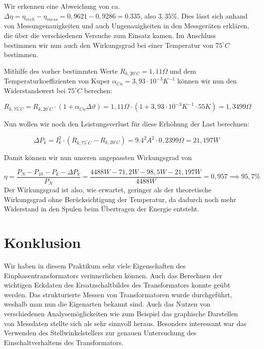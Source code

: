 \documentclass{article}
\begin{document}
Wir erkennen eine Abweichung von ca. $\Delta \eta = \eta_{rech} - \eta_{mess} = 0,9621 - 0,9286 = 0.335$, also $3,35\%$. Dies lässt sich anhand von Messungenauigkeiten und auch Ungenauigkeiten in den Messgeräten erklären, die über die verschiedenen Versuche zum Einsatz kamen. Im Anschluss bestimmen wir nun auch den Wirkungsgrad bei einer Temperatur von $75^{\circ}C$ bestimmen.

Mithilfe des vorher bestimmten Werte $R_{k,20^{\circ}C} = 1,11\Omega$ und dem Temperaturkoeffizienten von Kuper $\alpha_{Cu} = 3,93 \cdot 10^{-3}K^{-1}$ können wir nun den Widerstandswert bei $75^{\circ}C$ berechen:

\begin{equation*}
  \label{eq:4}
  R_{k,75^{\circ}C} = R_{k, 20^{\circ}C} \cdot (1+\alpha_{Cu}\Delta\vartheta) = 1,11\Omega \cdot (1+3,93\cdot 10^{-3}K^{-1}\cdot 55K) = 1,3499\Omega
\end{equation*}

Nun wollen wir noch den Leistungsverlust für diese Erhöhung der Last berechnen:

\begin{equation*}
  \label{eq:2}
  \Delta P_{k} = I_{k}^{2} \cdot (R_{k,75^{\circ}C} - R_{k,20^{\circ}C}) = 9.4^{2}A^{2} \cdot 0,2399\Omega = 21,197W
\end{equation*}

Damit können wir nun unseren angepassten Wirkungsgrad von

\begin{equation*}
  \label{eq:5}
  \eta = \frac{P_{N} - P_{10} - P_{k} - \Delta P_{k}}{P_{N}} = \frac{4488W-71,2W-98,5W-21,197W}{4488W} = 0,957 \implies 95,7\%
\end{equation*}
Der Wirkungsgrad ist also, wie erwartet, geringer als der theoretische Wirkungsgrad ohne Berücksichtigung der Temperatur, da dadurch noch mehr Widerstand in den Spulen beim Übertragen der Energie entsteht.

\section{Konklusion}
\label{sec:konklusion}

Wir haben in diesem Praktikum sehr viele Eigenschaften des Einphasentransformators verinnerlichen können. Auch das Berechnen der wichtigen Eckdaten des Ersatzschaltbildes des Transformators konnte geübt werden. Das strukturierte Messen von Transformatoren wurde durchgeführt, weshalb man nun die Eigenarten bekannt sind. Auch das Nutzen von verschiedenen Analysemöglickeiten wie zum Beispiel das graphische Darstellen von Messdaten stellte sich als sehr sinnvoll heraus. Besonders interessant war das Verwenden des Stellwinkelstellers zur genauen Untersuchung des Einschaltverhaltens des Transformators.
\end{document}
